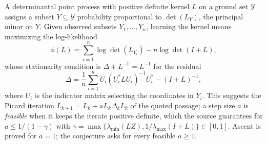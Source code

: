 A determinantal point process with positive definite kernel $L$ on a ground set $\mathcal Y$ assigns a subset $Y\subseteq\mathcal Y$ probability proportional to $\det(L_Y)$, the principal minor on $Y$.  Given observed subsets $Y_1,\ldots,Y_n$, learning the kernel means maximizing the log-likelihood
\[
\phi(L)=\sum_{i=1}^n\log\det(L_{Y_i})-n\log\det(I+L),
\]
whose stationarity condition is $\Delta+L^{-1}=L^{-1}$ for the residual
\[
\Delta=\frac1n\sum_{i=1}^nU_i(U_i^*LU_i)^{-1}U_i^*-(I+L)^{-1},
\]
where $U_i$ is the indicator matrix selecting the coordinates in $Y_i$.  This suggests the Picard iteration $L_{k+1}=L_k+aL_k\Delta_kL_k$ of the quoted passage; a step size $a$ is \emph{feasible} when it keeps the iterate positive definite, which the source guarantees for $a\le1/(1-\gamma)$ with $\gamma=\max\{\lambda_{\min}(LZ),1/\lambda_{\max}(I+L)\}\in[0,1]$.  Ascent is proved for $a=1$; the conjecture asks for every feasible $a\ge1$.

